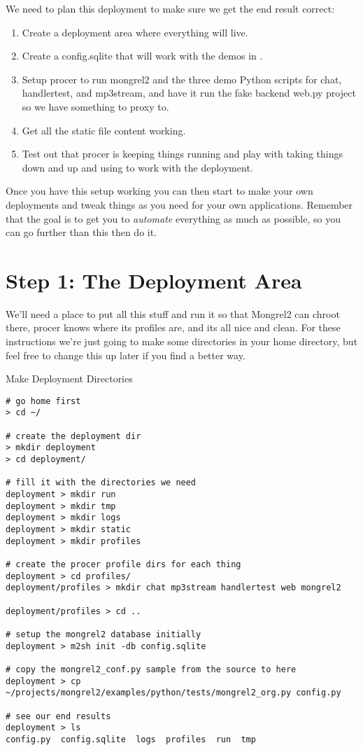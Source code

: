 We need to plan this deployment to make sure we get the end result correct:

\begin{enumerate}
\item Create a deployment area where everything will live.
\item Create a config.sqlite that will work with the demos in .
\item Setup procer to run mongrel2 and the three demo Python scripts for chat, handlertest, and mp3stream,
    and have it run the fake backend web.py project so we have something to proxy to.
\item Get all the static file content working.
\item Test out that procer is keeping things running and play with taking things down and up and using
     to work with the deployment.
\end{enumerate}

Once you have this setup working you can then start to make your own
deployments and tweak things as you need for your own applications.  Remember
that the goal is to get you to \emph{automate} everything as much as possible,
so you can go further than this then do it.

\section{Step 1: The Deployment Area}

We'll need a place to put all this stuff and run it so that Mongrel2 can chroot
there, procer knows where its profiles are, and its all nice and clean.  For these
instructions we're just going to make some directories in your home directory,
but feel free to change this up later if you find a better way.

\begin{code}{Make Deployment Directories}
\begin{Verbatim}
# go home first
> cd ~/

# create the deployment dir
> mkdir deployment
> cd deployment/

# fill it with the directories we need
deployment > mkdir run
deployment > mkdir tmp
deployment > mkdir logs
deployment > mkdir static
deployment > mkdir profiles

# create the procer profile dirs for each thing
deployment > cd profiles/
deployment/profiles > mkdir chat mp3stream handlertest web mongrel2

deployment/profiles > cd ..

# setup the mongrel2 database initially
deployment > m2sh init -db config.sqlite

# copy the mongrel2_conf.py sample from the source to here
deployment > cp ~/projects/mongrel2/examples/python/tests/mongrel2_org.py config.py

# see our end results
deployment > ls
config.py  config.sqlite  logs	profiles  run  tmp

\end{Verbatim}
\end{code}

